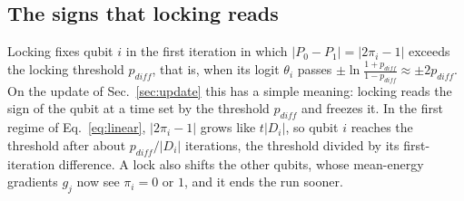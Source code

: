 \documentclass[onecolumn,10pt]{article}
\theoremstyle{remark}
\theoremstyle{plain}
\begin{document}
\subsection{The signs that locking reads}
\label{sec:locksigns}
Locking fixes qubit $i$ in the first iteration in which $|P_0-P_1|=|2\pi_i-1|$ exceeds the locking threshold $p_{diff}$, that is, when its logit $\theta_i$ passes $\pm\ln\frac{1+p_{diff}}{1-p_{diff}}\approx\pm2p_{diff}$. On the update of Sec.~\ref{sec:update} this has a simple meaning: locking reads the sign of the qubit at a time set by the threshold $p_{diff}$ and freezes it. In the first regime of Eq.~\eqref{eq:linear}, $|2\pi_i-1|$ grows like $t|D_i|$, so qubit $i$ reaches the threshold after about $p_{diff}/|D_i|$ iterations, the threshold divided by its first-iteration difference. A lock also shifts the other qubits, whose mean-energy gradients $g_j$ now see $\pi_i=0$ or $1$, and it ends the run sooner.
\end{document}
